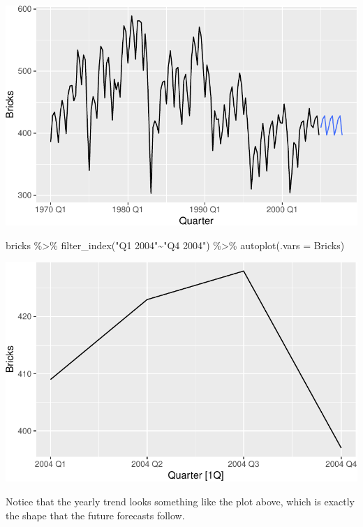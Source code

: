 \documentclass[
  letterpaper,
  DIV=11,
  numbers=noendperiod]{scrartcl}
\newenvironment{Shaded}{\begin{snugshade}}{\end{snugshade}}
\newcommand{\AttributeTok}[1]{\textcolor[rgb]{0.40,0.45,0.13}{#1}}
\newcommand{\FunctionTok}[1]{\textcolor[rgb]{0.28,0.35,0.67}{#1}}
\newcommand{\NormalTok}[1]{\textcolor[rgb]{0.00,0.23,0.31}{#1}}
\newcommand{\SpecialCharTok}[1]{\textcolor[rgb]{0.37,0.37,0.37}{#1}}
\newcommand{\StringTok}[1]{\textcolor[rgb]{0.13,0.47,0.30}{#1}}
\begin{document}
\begin{center}
\includegraphics{chapter5_review_files/figure-pdf/unnamed-chunk-16-1.pdf}
\end{center}

\begin{Shaded}
\begin{Highlighting}[]
\NormalTok{bricks }\SpecialCharTok{\%\textgreater{}\%}
  \FunctionTok{filter\_index}\NormalTok{(}\StringTok{"Q1 2004"}\SpecialCharTok{\textasciitilde{}}\StringTok{"Q4 2004"}\NormalTok{) }\SpecialCharTok{\%\textgreater{}\%}
  \FunctionTok{autoplot}\NormalTok{(}\AttributeTok{.vars =}\NormalTok{ Bricks)}
\end{Highlighting}
\end{Shaded}

\begin{center}
\includegraphics{chapter5_review_files/figure-pdf/unnamed-chunk-17-1.pdf}
\end{center}

Notice that the yearly trend looks something like the plot above, which
is exactly the shape that the future forecasts follow.
\end{document}
